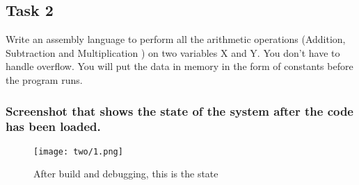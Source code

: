 \documentclass[a4paper,12pt]{article}
\begin{document}
\subsection{Task 2}
Write an assembly language to perform all the arithmetic operations
(Addition, Subtraction and Multiplication ) on two variables X and Y.
You don’t have to handle overflow. You will put the data in memory
in the form of constants before the program runs.
\subsubsection{Screenshot that shows the state of the system after the code has been loaded.}
\vspace{0.3cm}
\begin{figure}[H]
    \centering
    \texttt{[image: two/1.png]}
    \caption{After build and debugging, this is the state }
\end{figure}
\end{document}
